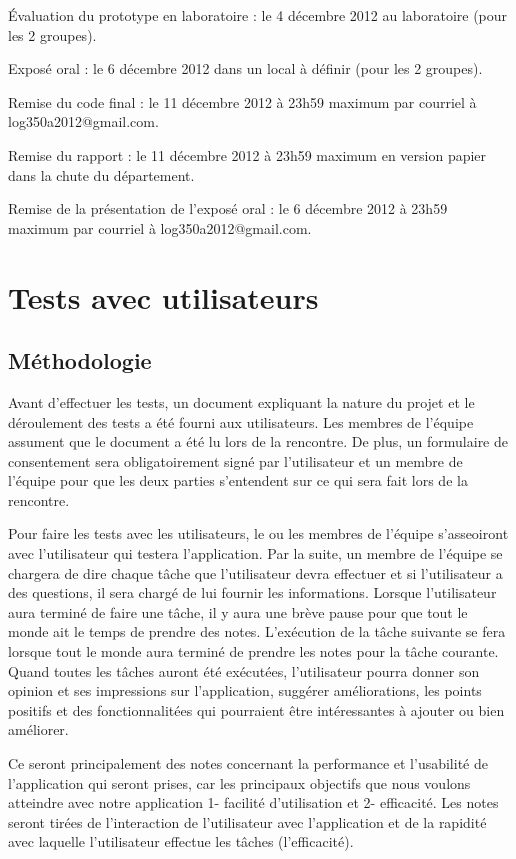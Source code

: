 \documentclass[letterpaper, oneside, 12pt, these, creativecommons]{thETS}
\begin{document}
Évaluation du prototype en laboratoire  : le 4 décembre 2012 au laboratoire (pour les 2 groupes).

Exposé oral  : le 6 décembre 2012 dans un local à définir (pour les 2 groupes).

Remise du code final : le 11 décembre 2012 à 23h59 maximum par courriel à log350a2012@gmail.com.

Remise du rapport :  le 11 décembre 2012 à 23h59 maximum en version papier dans la chute du département.

Remise de la présentation de l’exposé oral : le 6 décembre 2012 à 23h59 maximum par courriel à log350a2012@gmail.com.

\chapter{Tests avec utilisateurs}

\section{Méthodologie}

Avant d'effectuer les tests, un document expliquant la nature du projet et le déroulement des tests a été fourni aux utilisateurs. Les membres de l'équipe assument que le document a été lu lors de la rencontre. De plus, un formulaire de consentement sera obligatoirement signé par l'utilisateur et un membre de l'équipe pour que les deux parties s'entendent sur ce qui sera fait lors de la rencontre.

Pour faire les tests avec les utilisateurs, le ou les membres de l'équipe s'asseoiront avec l'utilisateur qui testera l'application. Par la suite, un membre de l'équipe se chargera de dire chaque tâche que l'utilisateur devra effectuer et si l'utilisateur a des questions, il sera chargé de lui fournir les informations. Lorsque l'utilisateur aura terminé de faire une tâche, il y aura une brève pause pour que tout le monde ait le temps de prendre des notes. L'exécution de la tâche suivante se fera lorsque tout le monde aura terminé de prendre les notes pour la tâche courante. Quand toutes les tâches auront été exécutées, l'utilisateur pourra donner son opinion et ses impressions sur l'application, suggérer améliorations, les points positifs et des fonctionnalitées qui pourraient être intéressantes à ajouter ou bien améliorer.

Ce seront principalement des notes concernant la performance et l'usabilité de l'application qui seront prises, car les principaux objectifs que nous voulons atteindre avec notre application 1- facilité d'utilisation et 2- efficacité. Les notes seront tirées de l'interaction de l'utilisateur avec l'application et de la rapidité avec laquelle l'utilisateur effectue les tâches (l'efficacité).
\end{document}
